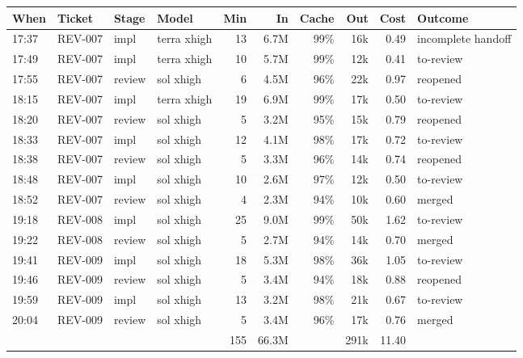 \documentclass[11pt,a4paper]{article}
\begin{document}
{\small
\begin{tabularx}{\linewidth}{@{}llllrrrrrX@{}}
\toprule
When & Ticket & Stage & Model & Min & In & Cache & Out & Cost & Outcome \\
\midrule
17:37 & REV-007 & impl & terra xhigh & 13 & 6.7M & 99\% & 16k & 0.49 & incomplete handoff \\
17:49 & REV-007 & impl & terra xhigh & 10 & 5.7M & 99\% & 12k & 0.41 & to-review \\
17:55 & REV-007 & review & sol xhigh & 6 & 4.5M & 96\% & 22k & 0.97 & reopened \\
18:15 & REV-007 & impl & terra xhigh & 19 & 6.9M & 99\% & 17k & 0.50 & to-review \\
18:20 & REV-007 & review & sol xhigh & 5 & 3.2M & 95\% & 15k & 0.79 & reopened \\
18:33 & REV-007 & impl & sol xhigh & 12 & 4.1M & 98\% & 17k & 0.72 & to-review \\
18:38 & REV-007 & review & sol xhigh & 5 & 3.3M & 96\% & 14k & 0.74 & reopened \\
18:48 & REV-007 & impl & sol xhigh & 10 & 2.6M & 97\% & 12k & 0.50 & to-review \\
18:52 & REV-007 & review & sol xhigh & 4 & 2.3M & 94\% & 10k & 0.60 & merged \\
19:18 & REV-008 & impl & sol xhigh & 25 & 9.0M & 99\% & 50k & 1.62 & to-review \\
19:22 & REV-008 & review & sol xhigh & 5 & 2.7M & 94\% & 14k & 0.70 & merged \\
19:41 & REV-009 & impl & sol xhigh & 18 & 5.3M & 98\% & 36k & 1.05 & to-review \\
19:46 & REV-009 & review & sol xhigh & 5 & 3.4M & 94\% & 18k & 0.88 & reopened \\
19:59 & REV-009 & impl & sol xhigh & 13 & 3.2M & 98\% & 21k & 0.67 & to-review \\
20:04 & REV-009 & review & sol xhigh & 5 & 3.4M & 96\% & 17k & 0.76 & merged \\
\midrule
 & & & & 155 & 66.3M & & 291k & 11.40 & \\
\bottomrule
\end{tabularx}
}

\begin{center}
\end{center}
\end{document}
